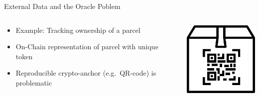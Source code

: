 \documentclass[]{beamer}
\begin{document}
\begin{frame}{External Data and the Oracle Poblem}
	\begin{columns}
		\begin{column}{0.6\textwidth}
			\begin{itemize}[<+->]
				\item Example: Tracking ownership of a parcel
				\item On-Chain representation of parcel with unique token
				\item Reproducible crypto-anchor (e.g.~QR-code) is problematic
			\end{itemize}
		\end{column}
		\begin{column}{0.4\textwidth}
			\includegraphics[width=4cm]{../assets/images/parcel.png}
		\end{column}
	\end{columns}
\end{frame}

\end{document}
